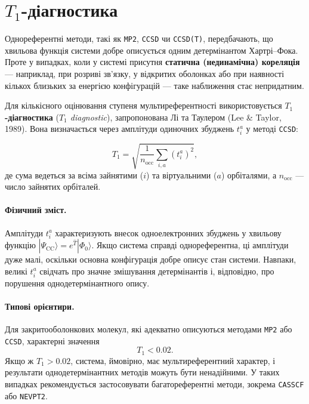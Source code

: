 

\section{$T_1$-діагностика}

Однореферентні методи, такі як \texttt{MP2}, \texttt{CCSD} чи \texttt{CCSD(T)},
передбачають, що хвильова функція системи добре описується
одним детермінантом Хартрі–Фока. Проте у випадках, коли
у системі присутня \textbf{статична (нединамічна) кореляція} ---
наприклад, при розриві зв’язку, у відкритих оболонках або при
наявності кількох близьких за енергією конфігурацій ---
таке наближення стає непридатним.

Для кількісного оцінювання ступеня мультиреферентності
використовується \textbf{$T_1$-діагностика} (\emph{$T_1$ diagnostic}),
запропонована Лі та Таулером (Lee \& Taylor, 1989).
Вона визначається через амплітуди одиночних збуджень \( t_i^a \)
у методі \texttt{CCSD}:

\begin{equation}
    T_1 = \sqrt{\frac{1}{n_\text{occ}} \sum_{i,a} (t_i^a)^2},
\end{equation}
де сума ведеться за всіма зайнятими (\(i\)) та віртуальними (\(a\))
орбіталями, а \(n_\text{occ}\) --- число зайнятих орбіталей.

\paragraph{Фізичний зміст.}
Амплітуди \(t_i^a\) характеризують внесок одноелектронних
збуджень у хвильову функцію \(|\Psi_{\text{CC}}\rangle = e^{\hat{T}}|\Phi_0\rangle\).
Якщо система справді однореферентна, ці амплітуди дуже малі,
оскільки основна конфігурація добре описує стан системи.
Навпаки, великі \(t_i^a\) свідчать про значне змішування детермінантів
і, відповідно, про порушення однодетермінантного опису.

\paragraph{Типові орієнтири.}
Для закритооболонкових молекул, які адекватно описуються
методами \texttt{MP2} або \texttt{CCSD}, характерні значення
\[
T_1 < 0.02.
\]
Якщо ж \(T_1 > 0.02\), система, ймовірно, має мультиреферентний характер,
і результати однодетермінантних методів можуть бути ненадійними.
У таких випадках рекомендується застосовувати багатореферентні методи,
зокрема \texttt{CASSCF} або \texttt{NEVPT2}.


